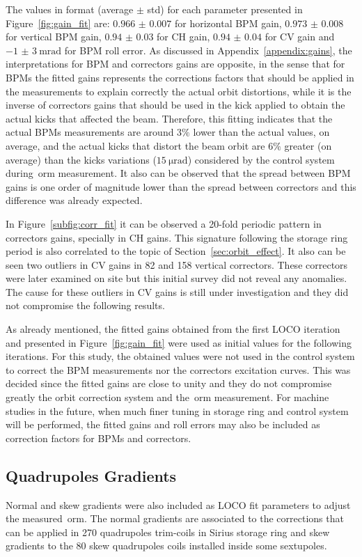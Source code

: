 The values in format (average $\pm$ std) for each parameter presented in Figure~\ref{fig:gain_fit} are: $\num{0.966(7)}$ for horizontal BPM gain, $\num{0.973(8)}$ for vertical BPM gain, $\num{0.94(3)}$ for CH gain, $\num{0.94(4)}$ for CV gain and $\SI{-1(3)}{\milli\radian}$ for BPM roll error. As discussed in Appendix~\ref{appendix:gains}, the interpretations for BPM and correctors gains are opposite, in the sense that for BPMs the fitted gains represents the corrections factors that should be applied in the measurements to explain correctly the actual orbit distortions, while it is the inverse of correctors gains that should be used in the kick applied to obtain the actual kicks that affected the beam. Therefore, this fitting indicates that the actual BPMs measurements are around $3\%$ lower than the actual values, on average, and the actual kicks that distort the beam orbit are $6\%$ greater (on average) than the kicks variations ($\SI{15}{\micro\radian}$) considered by the control system during~\gls{orm} measurement. It also can be observed that the spread between BPM gains is one order of magnitude lower than the spread between correctors and this difference was already expected.

In Figure~\ref{subfig:corr_fit} it can be observed a 20-fold periodic pattern in correctors gains, specially in CH gains. This signature following the storage ring period is also correlated to the topic of Section~\ref{sec:orbit_effect}. It also can be seen two outliers in CV gains in 82 and 158 vertical correctors. These correctors were later examined on site but this initial survey did not reveal any anomalies. The cause for these outliers in CV gains is still under investigation and they did not compromise the following results.

As already mentioned, the fitted gains obtained from the first LOCO iteration and presented in Figure~\ref{fig:gain_fit} were used as initial values for the following iterations. For this study, the obtained values were not used in the control system to correct the BPM measurements nor the correctors excitation curves. This was decided since the fitted gains are close to unity and they do not compromise greatly the orbit correction system and the~\gls{orm} measurement. For machine studies in the future, when much finer tuning in storage ring and control system will be performed, the fitted gains and roll errors may also be included as correction factors for BPMs and correctors.

\subsection{Quadrupoles Gradients}
Normal and skew gradients were also included as LOCO fit parameters to adjust the measured~\gls{orm}. The normal gradients are associated to the corrections that can be applied in 270 quadrupoles trim-coils in Sirius storage ring and skew gradients to the 80 skew quadrupoles coils installed inside some sextupoles.

